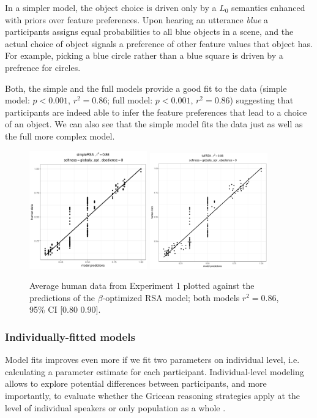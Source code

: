 \documentclass[10pt,a4paper]{article}
\begin{document}
In a simpler model, the object choice is driven only by a $L_0$ semantics enhanced with priors over feature preferences. Upon hearing an utterance \textit{blue} a participants assigns equal probabilities to all blue objects in a scene, and the actual choice of object signals a preference of other feature values that object has. For example, picking a blue circle rather than a blue square is driven by a prefrence for circles.

Both, the simple and the full models provide a good fit to the data (simple model: $p < 0.001$, $r^2 = 0.86$; full model: $p < 0.001$, $r^2 = 0.86$) suggesting that participants are indeed able to infer the feature preferences that lead to a choice of an object. We can also see that the simple model fits the data just as well as the full more complex model.

\begin{figure}[ht]
	\centering
	\includegraphics[width=2in]{images/m13.pdf}
	\includegraphics[width=2in]{images/m23.pdf}
	\caption{Average human data from Experiment 1 plotted against the predictions of the $\beta$-optimized RSA model; both models $r^{2}=0.86$, 95\% CI [0.80 0.90].}\label{simple-full}
\end{figure}

\subsubsection{Individually-fitted models}

Model fits improves even more if we fit two parameters on individual level, i.e. calculating a parameter estimate for each participant. Individual-level modeling allows to explore potential differences between participants, and more importantly, to evaluate whether the Gricean reasoning strategies apply at the level of individual speakers or only population as a whole \cite{franke2016reasoning}. 
\end{document}
